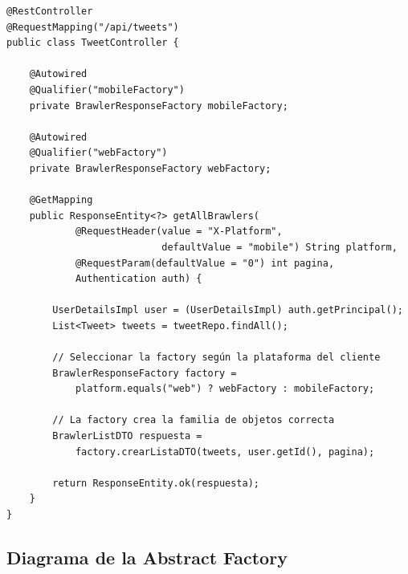 \documentclass[12pt,a4paper]{article}
\begin{document}
\begin{lstlisting}[caption={TweetController.java -- Uso del Abstract Factory seg\'un plataforma}]
@RestController
@RequestMapping("/api/tweets")
public class TweetController {

    @Autowired
    @Qualifier("mobileFactory")
    private BrawlerResponseFactory mobileFactory;

    @Autowired
    @Qualifier("webFactory")
    private BrawlerResponseFactory webFactory;

    @GetMapping
    public ResponseEntity<?> getAllBrawlers(
            @RequestHeader(value = "X-Platform",
                           defaultValue = "mobile") String platform,
            @RequestParam(defaultValue = "0") int pagina,
            Authentication auth) {

        UserDetailsImpl user = (UserDetailsImpl) auth.getPrincipal();
        List<Tweet> tweets = tweetRepo.findAll();

        // Seleccionar la factory según la plataforma del cliente
        BrawlerResponseFactory factory =
            platform.equals("web") ? webFactory : mobileFactory;

        // La factory crea la familia de objetos correcta
        BrawlerListDTO respuesta =
            factory.crearListaDTO(tweets, user.getId(), pagina);

        return ResponseEntity.ok(respuesta);
    }
}
\end{lstlisting}

\subsection{Diagrama de la Abstract Factory}
\end{document}

